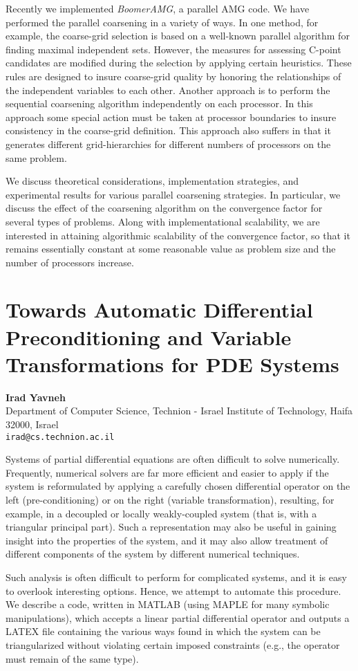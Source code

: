 \documentclass[11pt]{article}
\newcommand{\nextab}[4]{
	\section{#2}
	{\bf #1} \\ \nopagebreak
	{#3} \\ \nopagebreak
	{\tt #4} \nopagebreak
	}
\begin{document}
Recently we implemented {\em BoomerAMG}, a parallel AMG code. We have
performed the parallel coarsening in a variety of ways. In one method,
for example, the coarse-grid selection is based on a well-known
parallel algorithm for finding maximal independent sets.  However, the
measures for assessing C-point candidates are modified during the
selection by applying certain heuristics.  These rules are designed to
insure coarse-grid quality by honoring the relationships of the
independent variables to each other. Another approach is to perform
the sequential coarsening algorithm independently on each
processor. In this approach some special action must be taken at
processor boundaries to insure consistency in the coarse-grid
definition.  This approach also suffers in that it generates different
grid-hierarchies for different numbers of processors on the same
problem.

We discuss theoretical considerations, implementation strategies, and
experimental results for various parallel coarsening strategies. In
particular, we discuss the effect of the coarsening algorithm on the
convergence factor for several types of problems.  Along with
implementational scalability, we are interested in attaining algorithmic
scalability of the convergence factor, so that it remains essentially
constant at some reasonable value as problem size and the number of
processors increase.


\nextab{Irad Yavneh}
	{Towards Automatic Differential Preconditioning and Variable
		Transformations for PDE Systems}
	{Department of Computer Science,
		Technion - Israel Institute of Technology,
		Haifa 32000, Israel}
	{irad@cs.technion.ac.il}

Systems of partial differential equations are often difficult to solve
numerically. Frequently, numerical solvers are far more efficient and
easier to apply if the system is reformulated by applying a carefully
chosen differential operator on the left (pre-conditioning) or on the
right (variable transformation), resulting, for example, in a
decoupled or locally weakly-coupled system (that is, with a triangular
principal part). Such a representation may also be useful in gaining
insight into the properties of the system, and it may also allow
treatment of different components of the system by different numerical
techniques.

Such analysis is often difficult to perform for complicated systems,
and it is easy to overlook interesting options. Hence, we attempt to
automate this procedure. We describe a code, written in MATLAB (using
MAPLE for many symbolic manipulations), which accepts a linear
partial differential operator and outputs a LATEX file containing the
various ways found in which the system can be triangularized without
violating certain imposed constraints (e.g., the operator must remain
of the same type).
\end{document}
